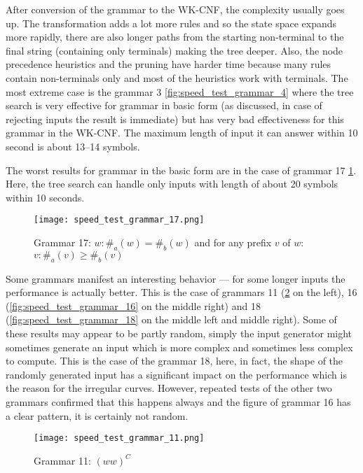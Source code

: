 After conversion of the grammar to the WK-CNF, the complexity usually goes up. The transformation adds a lot more rules and so the state space expands more rapidly, there are also longer paths from the starting non-terminal to the final string (containing only terminals) making the tree deeper. Also, the node precedence heuristics and the pruning have harder time because many rules contain non-terminals only and most of the heuristics work with terminals. The most extreme case is the grammar 3 \ref{fig:speed_test_grammar_4} where the tree search is very effective for grammar in basic form (as discussed, in case of rejecting inputs the result is immediate) but has very bad effectiveness for this grammar in the WK-CNF. The maximum length of input it can answer within 10 second is about 13--14 symbols.

The worst results for grammar in the basic form are in the case of grammar 17 \ref{fig:speed_test_grammar_17}. Here, the tree search can handle only inputs with length of about 20 symbols within 10 seconds.

\begin{figure}[h!]
  \texttt{[image: speed\_test\_grammar\_17.png]}
  \caption{Grammar 17: $w: \#_a(w) = \#_b(w)$ and for any prefix $v$ of $w$: $v: \#_a(v) \geq \#_b(v)$}
  \label{fig:speed_test_grammar_17}
\end{figure}

Some grammars manifest an interesting behavior --- for some longer inputs the performance is actually better. This is the case of grammars 11 (\ref{fig:speed_test_grammar_11} on the left), 16 (\ref{fig:speed_test_grammar_16} on the middle right) and 18 (\ref{fig:speed_test_grammar_18} on the middle left and middle right). Some of these results may appear to be partly random, simply the input generator might sometimes generate an input which is more complex and sometimes less complex to compute. This is the case of the grammar 18, here, in fact, the shape of the randomly generated input has a significant impact on the performance which is the reason for the irregular curves. However, repeated tests of the other two grammars confirmed that this happens always and the figure of grammar 16 has a clear pattern, it is certainly not random.

\begin{figure}[h!]
  \texttt{[image: speed\_test\_grammar\_11.png]}
  \caption{Grammar 11: $(ww)^C$}
  \label{fig:speed_test_grammar_11}
\end{figure}

